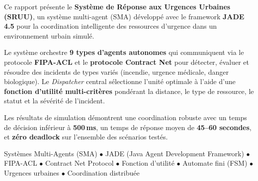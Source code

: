 \documentclass[12pt, a4paper]{report}
\begin{document}
\thispagestyle{empty}
\vspace*{2cm}

\begin{tcolorbox}[
  enhanced, breakable,
  colback=LightBg, colframe=CyanNeon, arc=0pt,
  title={\bfseries\large Résumé},
  fonttitle=\color{NavyDark},
  attach boxed title to top left={yshift=-2mm, xshift=8mm},
  boxed title style={colback=CyanNeon, arc=0pt}
]
Ce rapport présente le \textbf{Système de Réponse aux Urgences Urbaines (SRUU)}, un système
multi-agent (SMA) développé avec le framework \textbf{JADE 4.5} pour la coordination intelligente
des ressources d'urgence dans un environnement urbain simulé.

Le système orchestre \textbf{9 types d'agents autonomes} qui communiquent via le protocole
\textbf{FIPA-ACL} et le \textbf{protocole Contract Net} pour détecter, évaluer et résoudre
des incidents de types variés (incendie, urgence médicale, danger biologique). Le
\textit{Dispatcher} central sélectionne l'unité optimale à l'aide d'une
\textbf{fonction d'utilité multi-critères} pondérant la distance, le type de ressource,
le statut et la sévérité de l'incident.

Les résultats de simulation démontrent une coordination robuste avec un temps de décision
inférieur à \textbf{500\,ms}, un temps de réponse moyen de \textbf{45--60 secondes},
et \textbf{zéro deadlock} sur l'ensemble des scénarios testés.
\end{tcolorbox}

\vspace{1cm}

\begin{tcolorbox}[
  enhanced,
  colback=NavyCard!20, colframe=OrangeNeon, arc=0pt,
  title={\bfseries Mots-clés},
  fonttitle=\color{white},
  attach boxed title to top left={yshift=-2mm, xshift=8mm},
  boxed title style={colback=OrangeNeon, arc=0pt}
]
Systèmes Multi-Agents (SMA) $\bullet$
JADE (Java Agent Development Framework) $\bullet$
FIPA-ACL $\bullet$
Contract Net Protocol $\bullet$
Fonction d'utilité $\bullet$
Automate fini (FSM) $\bullet$
Urgences urbaines $\bullet$
Coordination distribuée
\end{tcolorbox}

\clearpage

\tableofcontents
\clearpage
\end{document}
